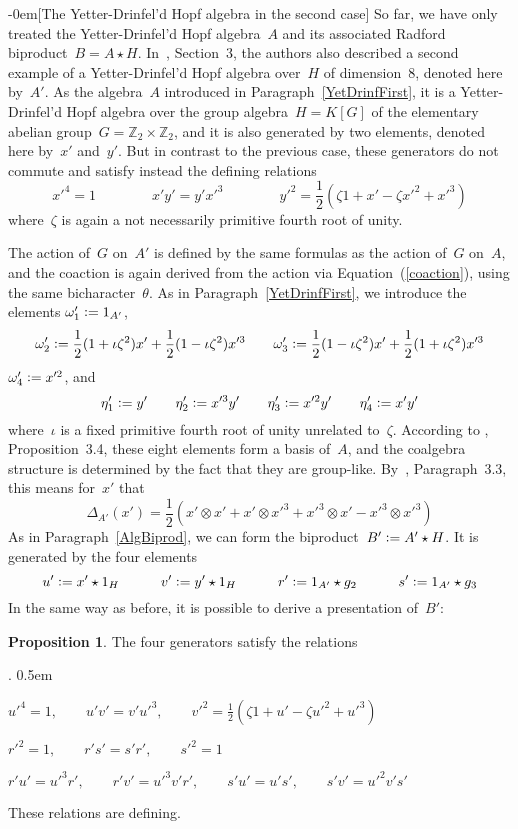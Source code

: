 \documentclass{article}
\makeatletter
\renewcommand{\subsection}{\@startsection{subsection}{2}{0em}%
{\baselineskip}{-0em}{\bfseries\normalsize}}
\newcounter{num}
\newcounter{num1}
\newenvironment{proplist}{\begin{list}{\arabic{num1}.}{\usecounter{num1} \listparindent0pt \topsep-2pt  \leftmargin25pt \itemindent0pt \itemsep5pt \partopsep0pt \labelwidth10pt \labelsep0.5em }}{\end{list}}
\numberwithin{equation}{section}
\theoremstyle{definition}
\newtheorem*{prop}{Proposition}
\theoremstyle{break}
\newcommand{\ot}{\mathbin{\otimes}}
\newcommand{\deq}{\vcentcolon =}
\newcommand{\K}{1}
\newcommand{\xu}{x'}
\newcommand{\yu}{y'}
\newcommand{\uu}{u'}
\newcommand{\vu}{v'}
\newcommand{\ru}{r'}
\newcommand{\su}{s'}
\newcommand{\omu}{\omega'}
\newcommand{\etu}{\eta'}
\newcommand{\Au}{A'}
\newcommand{\Bu}{B'}
\newcommand{\1}{{(1)}}
\newcommand{\2}{{(2)}}
\newcommand{\3}{{(3)}}
\newcommand{\Z}{{\mathbb Z}}
\newcommand{\HH}{1_H}
\makeatother
\begin{document}
\subsection[The Yetter-Drinfel'd Hopf algebra in the second case]{} \label{YetDrinfSec}
So far, we have only treated the Yetter-Drinfel'd Hopf algebra~$A$ and its associated Radford biproduct~$B = A \star H$. In~\cite{KaSo2}, Section~3, the authors also described a second example of a Yetter-Drinfel'd Hopf algebra over~$H$ of dimension~$8$, denoted here by~$\Au$. As the algebra~$A$ introduced in Paragraph~\ref{YetDrinfFirst}, it is a Yetter-Drinfel'd Hopf algebra over the group algebra~$H=K[G]$ of the elementary abelian group~$G = \Z_2 \times \Z_2$, and it is also generated by two elements, denoted here by~$\xu$ and~$\yu$. But in contrast to the previous case, these generators do not commute and satisfy instead the defining relations
\[\xu^4 = 1 \qquad \qquad \xu \yu = \yu \xu^3 \qquad \qquad
\yu^2 = \frac{\K}{2}(\zeta 1 + \xu - \zeta \xu^2 + \xu^3)\]
where~$\zeta$ is again a not necessarily primitive fourth root of unity.

The action of~$G$ on~$\Au$ is defined by the same formulas as the action of~$G$ on~$A$, and the coaction is again derived from the action via Equation~(\ref{coaction}), using the same bicharacter~$\theta$. As in Paragraph~\ref{YetDrinfFirst}, we introduce the elements $\omu_1 \deq 1_{\Au}$,
\[\omu_2 \deq \frac{\K}{2}(1 + \iota \zeta^2) \xu + \frac{\K}{2}(1 - \iota \zeta^2) \xu^3 \qquad
\omu_3 \deq \frac{\K}{2}(1 - \iota \zeta^2) \xu + \frac{\K}{2}(1 + \iota \zeta^2) \xu^3\]
$\omu_4 \deq \xu^2$, and
\[\etu_1 \deq \yu \qquad \etu_2 \deq \xu^3 \yu \qquad \etu_3 \deq \xu^2 \yu \qquad \etu_4 \deq \xu \yu\]
where~$\iota$ is a fixed primitive fourth root of unity unrelated to~$\zeta$. According to \cite{KaSo2}, Proposition~3.4, these eight elements form a basis of~$A$, and the coalgebra structure is determined by the fact that they are group-like. By~\cite{KaSo2}, Paragraph~3.3, this means for~$\xu$ that
\[\Delta_{\Au}(\xu) =
\frac{\K}{2} (\xu \ot \xu + \xu \ot \xu^3 + \xu^3 \ot \xu - \xu^3 \ot \xu^3)\]
As in Paragraph~\ref{AlgBiprod}, we can form the biproduct~$\Bu \deq \Au \star H$. It is generated by the four elements
\[\uu \deq \xu \star \HH \qquad \quad \vu \deq \yu \star \HH \qquad \quad
\ru \deq 1_{\Au} \star g_2 \qquad \quad \su \deq 1_{\Au} \star g_3\]
In the same way as before, it is possible to derive a presentation of~$\Bu$:
\enlargethispage{4pt}
\begin{prop}
The four generators satisfy the relations
\begin{proplist}
\item
$\displaystyle
\uu^4 = 1, \qquad \uu \vu = \vu \uu^3, \qquad
\vu^2 = \frac{\K}{2}(\zeta 1 + \uu - \zeta \uu^2 + \uu^3)$

\item
$\displaystyle
\ru^2 = 1, \qquad \ru \su = \su \ru, \qquad \su^2 = 1$

\item
$\displaystyle
\ru \uu = \uu^3 \ru, \qquad \ru \vu = \uu^3 \vu \ru, \qquad \su \uu = \uu \su, \qquad
\su \vu = \uu^2 \vu \su$
\end{proplist}
These relations are defining.
\end{prop}
\end{document}
